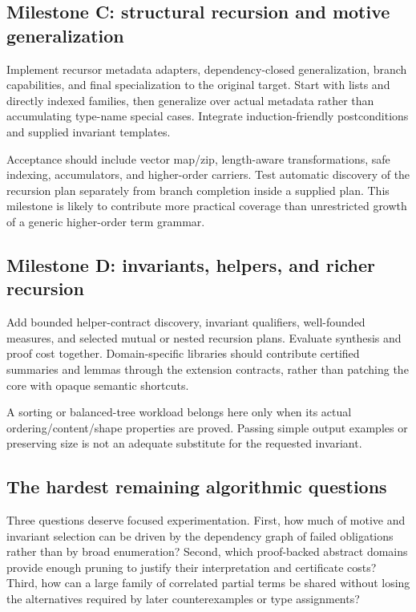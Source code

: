 \documentclass[11pt,letterpaper]{article}
\theoremstyle{definition}
\theoremstyle{remark}
\begin{document}
\subsection{Milestone C: structural recursion and motive generalization}

Implement recursor metadata adapters, dependency-closed generalization, branch capabilities, and final specialization to the original target. Start with lists and directly indexed families, then generalize over actual metadata rather than accumulating type-name special cases. Integrate induction-friendly postconditions and supplied invariant templates.

Acceptance should include vector map/zip, length-aware transformations, safe indexing, accumulators, and higher-order carriers. Test automatic discovery of the recursion plan separately from branch completion inside a supplied plan. This milestone is likely to contribute more practical coverage than unrestricted growth of a generic higher-order term grammar.

\subsection{Milestone D: invariants, helpers, and richer recursion}

Add bounded helper-contract discovery, invariant qualifiers, well-founded measures, and selected mutual or nested recursion plans. Evaluate synthesis and proof cost together. Domain-specific libraries should contribute certified summaries and lemmas through the extension contracts, rather than patching the core with opaque semantic shortcuts.

A sorting or balanced-tree workload belongs here only when its actual ordering/content/shape properties are proved. Passing simple output examples or preserving size is not an adequate substitute for the requested invariant.

\subsection{The hardest remaining algorithmic questions}

Three questions deserve focused experimentation. First, how much of motive and invariant selection can be driven by the dependency graph of failed obligations rather than by broad enumeration? Second, which proof-backed abstract domains provide enough pruning to justify their interpretation and certificate costs? Third, how can a large family of correlated partial terms be shared without losing the alternatives required by later counterexamples or type assignments?
\end{document}
